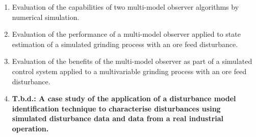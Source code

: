 \begin{enumerate}
	\item Evaluation of the capabilities of two multi-model observer algorithms by numerical simulation.
	\item Evaluation of the performance of a multi-model observer applied to state estimation of a simulated grinding process with an ore feed disturbance.
	\item Evaluation of the benefits of the multi-model observer as part of a simulated control system applied to a multivariable grinding process with an ore feed disturbance.
	\item \textbf{T.b.d.: A case study of the application of a disturbance model identification technique to characterise disturbances using simulated disturbance data and data from a real industrial operation.}
\end{enumerate}

